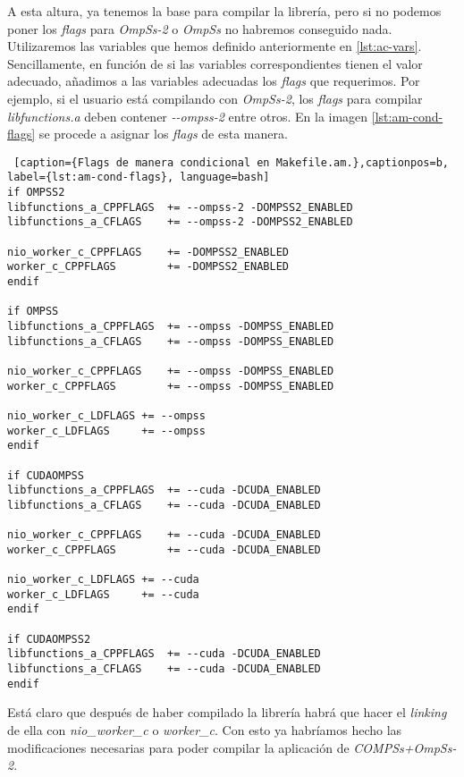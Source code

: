 \bigskip

A esta altura, ya tenemos la base para compilar la librería, pero si no podemos poner los \textit{flags} para \textit{OmpSs-2} o \textit{OmpSs} no habremos conseguido nada. Utilizaremos las variables que hemos definido anteriormente en \ref{lst:ac-vars}. Sencillamente, en función de si las variables correspondientes tienen el valor adecuado, añadimos a las variables adecuadas los \textit{flags} que requerimos. Por ejemplo, si el usuario está compilando con \textit{OmpSs-2}, los \textit{flags} para compilar \textit{libfunctions.a} deben contener \textit{-{}-ompss-2} entre otros. En la imagen \ref{lst:am-cond-flags} se procede a asignar los \textit{flags} de esta manera.

\bigskip

\begin{minipage}{\linewidth}
\begin{lstlisting} [caption={Flags de manera condicional en Makefile.am.},captionpos=b, label={lst:am-cond-flags}, language=bash]
if OMPSS2
libfunctions_a_CPPFLAGS  += --ompss-2 -DOMPSS2_ENABLED
libfunctions_a_CFLAGS    += --ompss-2 -DOMPSS2_ENABLED

nio_worker_c_CPPFLAGS    += -DOMPSS2_ENABLED
worker_c_CPPFLAGS        += -DOMPSS2_ENABLED
endif

if OMPSS
libfunctions_a_CPPFLAGS  += --ompss -DOMPSS_ENABLED
libfunctions_a_CFLAGS    += --ompss -DOMPSS_ENABLED

nio_worker_c_CPPFLAGS    += --ompss -DOMPSS_ENABLED
worker_c_CPPFLAGS        += --ompss -DOMPSS_ENABLED

nio_worker_c_LDFLAGS += --ompss
worker_c_LDFLAGS     += --ompss
endif

if CUDAOMPSS
libfunctions_a_CPPFLAGS  += --cuda -DCUDA_ENABLED
libfunctions_a_CFLAGS    += --cuda -DCUDA_ENABLED

nio_worker_c_CPPFLAGS    += --cuda -DCUDA_ENABLED
worker_c_CPPFLAGS        += --cuda -DCUDA_ENABLED

nio_worker_c_LDFLAGS += --cuda
worker_c_LDFLAGS     += --cuda
endif

if CUDAOMPSS2
libfunctions_a_CPPFLAGS  += --cuda -DCUDA_ENABLED
libfunctions_a_CFLAGS    += --cuda -DCUDA_ENABLED
endif
\end{lstlisting}
\end{minipage}

\bigskip

Está claro que después de haber compilado la librería habrá que hacer el \textit{linking} de ella con \textit{nio\_worker\_c} o \textit{worker\_c}. Con esto ya habríamos hecho las modificaciones necesarias para poder compilar la aplicación de \textit{COMPSs+OmpSs-2}.

